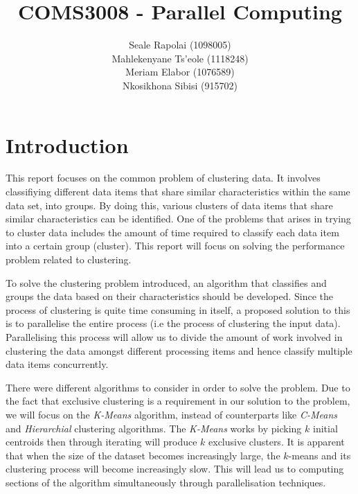 \documentclass[12pt]{article}
\begin{document}
	\title{COMS3008 - Parallel Computing}
	\author{Seale Rapolai (1098005)
          \\ Mahlekenyane Ts'eole (1118248)
          \\ Meriam Elabor (1076589)
          \\ Nkosikhona Sibisi (915702)
    }
	\maketitle

	\section{Introduction}
    	\begin{flushleft}
      		This report focuses on the common problem of clustering data. It involves classifiying different data items that share similar characteristics within the same data set, into groups. By doing this, various clusters of data items that share similar characteristics can be identified. One of the problems that arises in trying to cluster data includes the amount of time required to classify each data item into a certain group (cluster). This report will focus on solving the performance problem related to clustering.
    	\end{flushleft}

      	\begin{flushleft}
        	  To solve the clustering problem introduced, an algorithm that classifies and groups the data based on their characteristics should be developed. Since the process of clustering is quite time consuming in itself, a proposed solution to this is to parallelise the entire process (i.e the process of clustering the input data). Parallelising this process will allow us to divide the amount of work involved in clustering the data amongst different processing items and hence classify multiple data items concurrently.
      	\end{flushleft}

      	\begin{flushleft}
        	There were different algorithms to consider in order to solve the problem. Due to the fact that exclusive clustering is a requirement in our solution to the problem, we will focus on the \textit{K-Means} algorithm, instead of counterparts like \textit{C-Means} and \textit{Hierarchial} clustering algorithms. The \textit{K-Means} works by picking $k$ initial centroids then through iterating will produce $k$ exclusive clusters. It is apparent that when the size of the dataset becomes increasingly large, the $k$-means and its clustering process will become increasingly slow. This will lead us to computing sections of the algorithm simultaneously through parallelisation techniques.
      	\end{flushleft}
\end{document}
